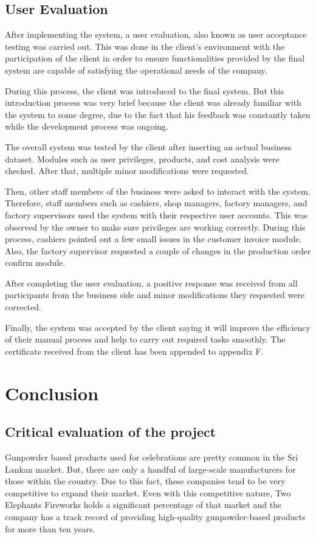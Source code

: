 \documentclass[12pt]{report}
\begin{document}
\section{User Evaluation}
After implementing the system, a user evaluation, also known as user acceptance testing was carried out. This was done in the client's environment with the participation of the client in order to ensure functionalities provided by the final system are capable of satisfying the operational needs of the company.

During this process, the client was introduced to the final system. But this introduction process was very brief because the client was already familiar with the system to some degree, due to the fact that his feedback was constantly taken while the development process was ongoing.

The overall system was tested by the client after inserting an actual business dataset. Modules such as user privileges, products, and cost analysis were checked. After that, multiple minor modifications were requested.

Then, other staff members of the business were asked to interact with the system. Therefore, staff members such as cashiers, shop managers, factory managers, and factory supervisors used the system with their respective user accounts. This was observed by the owner to make sure privileges are working correctly. During this process, cashiers pointed out a few small issues in the customer invoice module. Also, the factory supervisor requested a couple of changes in the production order confirm module.

After completing the user evaluation, a positive response was received from all participants from the business side and minor modifications they requested were corrected.

Finally, the system was accepted by the client saying it will improve the efficiency of their manual process and help to carry out required tasks smoothly. The certificate received from the client has been appended to appendix F.

\chapter{Conclusion}

\section{Critical evaluation of the project}
Gunpowder based products used for celebrations are pretty common in the Sri Lankan market. But, there are only a handful of large-scale manufacturers for those within the country. Due to this fact, these companies tend to be very competitive to expand their market. Even with this competitive nature, Two Elephants Fireworks holds a significant percentage of that market and the company has a track record of providing high-quality gunpowder-based products for more than ten years.
\end{document}
